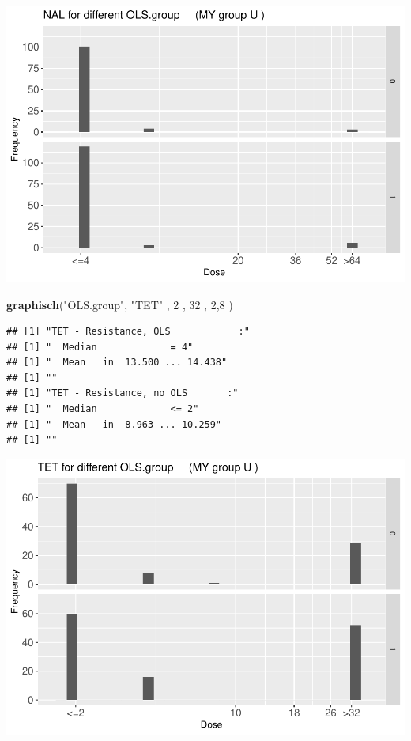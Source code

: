 \documentclass[
]{article}
\newenvironment{Shaded}{\begin{snugshade}}{\end{snugshade}}
\newcommand{\DecValTok}[1]{\textcolor[rgb]{0.00,0.00,0.81}{#1}}
\newcommand{\KeywordTok}[1]{\textcolor[rgb]{0.13,0.29,0.53}{\textbf{#1}}}
\newcommand{\NormalTok}[1]{#1}
\newcommand{\StringTok}[1]{\textcolor[rgb]{0.31,0.60,0.02}{#1}}
\begin{document}
\includegraphics{Verteilungen_files/figure-latex/unnamed-chunk-27-1.pdf}

\begin{Shaded}
\begin{Highlighting}[]
  \KeywordTok{graphisch}\NormalTok{(}\StringTok{"OLS.group"}\NormalTok{, }\StringTok{"TET"}\NormalTok{ , }\DecValTok{2}\NormalTok{    ,  }\DecValTok{32}\NormalTok{   ,   }\DecValTok{2}\NormalTok{,}\DecValTok{8}\NormalTok{    ) }
\end{Highlighting}
\end{Shaded}

\begin{verbatim}
## [1] "TET - Resistance, OLS            :"
## [1] "  Median             = 4"
## [1] "  Mean   in  13.500 ... 14.438"
## [1] ""
## [1] "TET - Resistance, no OLS       :"
## [1] "  Median             <= 2"
## [1] "  Mean   in  8.963 ... 10.259"
## [1] ""
\end{verbatim}

\includegraphics{Verteilungen_files/figure-latex/unnamed-chunk-28-1.pdf}
\end{document}
